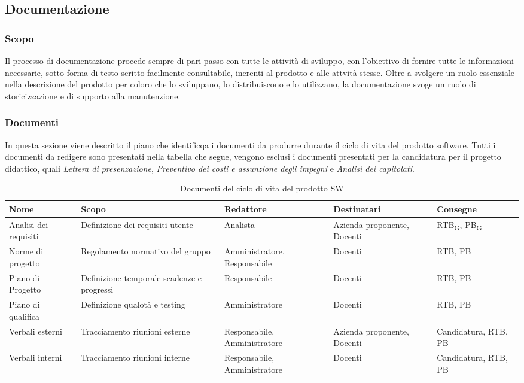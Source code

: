 \subsection{Documentazione}
\subsubsection{Scopo}
Il processo di documentazione procede sempre di pari passo con tutte le attività di sviluppo, con l'obiettivo di fornire tutte le informazioni necessarie, sotto forma di testo scritto facilmente consultabile, inerenti al prodotto e alle attvità stesse. Oltre a svolgere un ruolo essenziale nella descrizione del prodotto per coloro che lo sviluppano, lo distribuiscono e lo utilizzano, la documentazione svoge un ruolo di storicizzazione e di supporto alla manutenzione. 

\subsubsection{Documenti}
In questa sezione viene descritto il piano che identificqa i documenti da produrre durante il ciclo di vita del prodotto software. Tutti i documenti da redigere sono presentati nella tabella che segue, vengono esclusi i documenti presentati per la candidatura per il progetto didattico, quali \textit{Lettera di presenzazione}, \textit{Preventivo dei costi e assunzione degli impegni} e \textit{Analisi dei capitolati}.


\begin{table}[H]
    \centering
   \begin{tabularx}{\textwidth}{X|X|X|X|X}
        \textbf{Nome} & \textbf{Scopo} & \textbf{Redattore} & \textbf{Destinatari} & \textbf{Consegne} \\ \hline
        Analisi dei requisiti    & Definizione dei requisiti utente    & Analista & Azienda proponente, Docenti & RTB\textsubscript{G}, PB\textsubscript{G}    \\ \hline
        Norme di progetto    & Regolamento normativo del gruppo    & Amministratore, Responsabile &  Docenti & RTB, PB    \\ \hline
        Piano di Progetto   & Definizione temporale scadenze e progressi    & Responsabile &  Docenti & RTB, PB   \\ \hline
        Piano di qualifica   & Definizione qualotà e testing    & Amministratore &  Docenti & RTB, PB   \\ \hline
         Verbali esterni   & Tracciamento riunioni esterne   & Responsabile, Amministratore &  Azienda proponente, Docenti & Candidatura, RTB, PB   \\ \hline
         Verbali interni   & Tracciamento riunioni interne   & Responsabile, Amministratore &  Docenti & Candidatura, RTB, PB  
       
    \end{tabularx}
    \caption{Documenti del ciclo di vita del prodotto SW}
\end{table}


